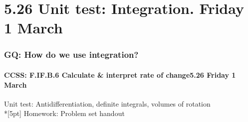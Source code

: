 \documentclass{beamer}
\begin{document}
\section{5.26 Unit test: Integration. Friday 1 March}
\frame
{
  \frametitle{GQ: How do we use integration?}
  \framesubtitle{CCSS: F.IF.B.6 Calculate \& interpret rate of change\hfill \alert{5.26 Friday 1 March}}

  \alert{Unit test:} Antidifferentiation, definite integrals, volumes of rotation\\*[5pt]
  Homework: Problem set handout
}
\end{document}
